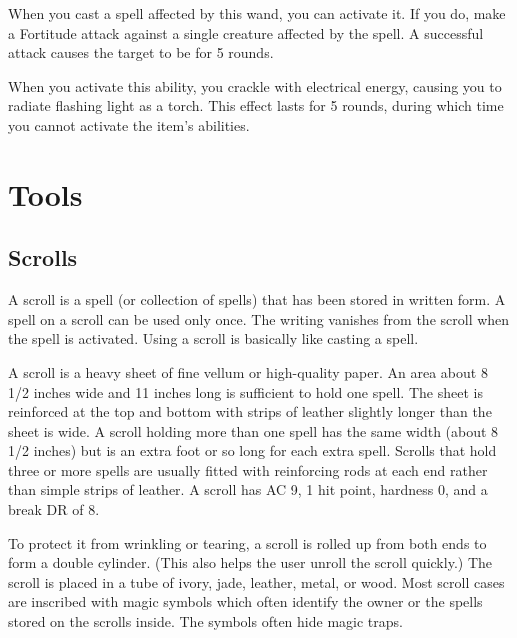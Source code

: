          When you cast a spell affected by this wand, you can activate it.
        If you do, make a Fortitude attack against a single creature affected by the spell.
        A successful attack causes the target to be \staggered for 5 rounds.

        When you activate this ability, you crackle with electrical energy, causing you to radiate flashing light as a torch.
        This effect lasts for 5 rounds, during which time you cannot activate the item's abilities.

\section{Tools}

    \subsection{Scrolls}
        A scroll is a spell (or collection of spells) that has been stored in written form.
        A spell on a scroll can be used only once.
        The writing vanishes from the scroll when the spell is activated.
        Using a scroll is basically like casting a spell.

         A scroll is a heavy sheet of fine vellum or high-quality paper.
        An area about 8 1/2 inches wide and 11 inches long is sufficient to hold one spell.
        The sheet is reinforced at the top and bottom with strips of leather slightly longer than the sheet is wide.
        A scroll holding more than one spell has the same width (about 8 1/2 inches) but is an extra foot or so long for each extra spell.
        Scrolls that hold three or more spells are usually fitted with reinforcing rods at each end rather than simple strips of leather.
        A scroll has AC 9, 1 hit point, hardness 0, and a break DR of 8.

        To protect it from wrinkling or tearing, a scroll is rolled up from both ends to form a double cylinder.
        (This also helps the user unroll the scroll quickly.) The scroll is placed in a tube of ivory, jade, leather, metal, or wood.
        Most scroll cases are inscribed with magic symbols which often identify the owner or the spells stored on the scrolls inside.
        The symbols often hide magic traps.


